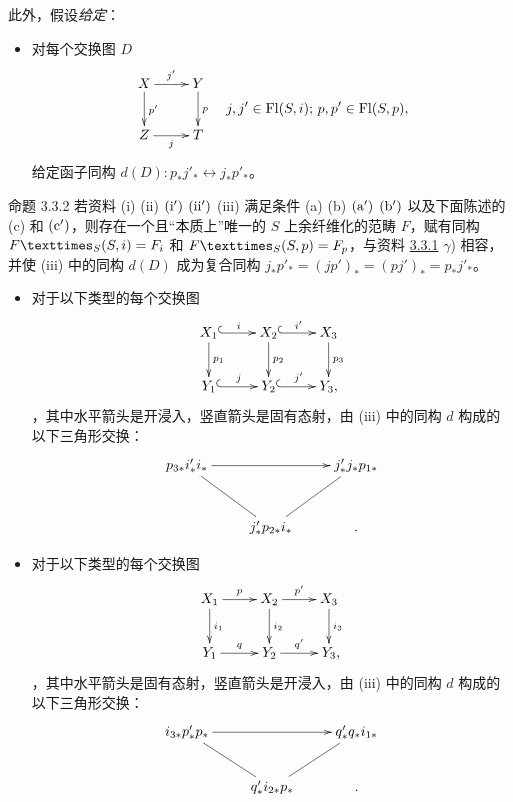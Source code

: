 此外，假设\emph{给定}：
\begin{itemize}
\item[(iii)] 对每个交换图 $D$
\[
\vcenter{
\xymatrix{
X \ar[r]^{j'} \ar[d]^{p'}& Y\ar[d]^{p} \\
Z \ar[r]_{j}             &           T
}}\quad j,j' \in \Fl(S,i)\text{; }
  p,p' \in \Fl(S,p),
\]
给定函子同构 $d(D):p_{\ast}j'_{\ast}\leftrightarrow
j_{\ast}p'_{\ast}$。
\end{itemize}

\begin{enonce*}{命题 3.3.2}
若资料 {\rm (i) (ii) ${\rm (i')}$ ${\rm (ii')}$ (iii)} 满足条件 {\rm (a) (b) ${\rm (a')}$ ${\rm (b')}$} 以及下面陈述的 {\rm(c)} 和 ${\rm (c')}$，则存在一个且“本质上”唯一的 $S$ 上余纤维化的范畴 $F$，赋有同构 $\fprod{F}{(S,i)}{S}=F_i$ 和 $\fprod{F}{(S,p)}{S}=F_p$，与资料 \hyperref[XVII.subsubsec3.3.1]{3.3.1} $\gamma$) 相容，并使 {\rm(iii)} 中的同构 $d(D)$ 成为复合同构 $j_{\ast}p'_{\ast}=(jp')_{\ast}=(pj')_{\ast}=p_{\ast}j'_{\ast}$。
\end{enonce*}

\begin{itemize}
\item[(c)] 对于以下类型的每个交换图
\[
\xymatrix{
X_1 \ar@{^{(}->}[r]^{i} \ar[d]^{p_1}& X_2 \ar@{^{(}->}[r]^{i'}
\ar[d]^{p_2}& X_3 \ar[d]^{p_3}\\
Y_1 \ar@{^{(}->}[r]^{j}& Y_2 \ar@{^{(}->}[r]^{j'}& Y_3,\\
}
\]
，其中\pageoriginale 水平箭头是开浸入，竖直箭头是固有态射，由 (iii) 中的同构 $d$ 构成的以下三角形交换：
\[
\xymatrix@R=1cm{
p_{3{\ast}} i'_{\ast} i_{\ast} \ar[rr] \ar@{-}[rd]&  & j'_{\ast}j_{\ast}p_{1{\ast}}\ar@{-}[ld]\\
                               &j'_{\ast}p_{2{\ast}}
                                i_{\ast}&.
}
\]

\item[(c')] 对于以下类型的每个交换图
\[
\xymatrix{
X_1  \ar[r]^{p} \ar[d]^{i_1}& X_2  \ar[r]^{p'} \ar[d]^{i_2}& X_3 \ar[d]^{i_3}          \\
Y_1         \ar[r]^{q} & Y_2  \ar[r]^{q'} & Y_3\rlap{,}
}
\]
，其中水平箭头是固有态射，竖直箭头是开浸入，由 (iii) 中的同构 $d$ 构成的以下三角形交换：
\[
\xymatrix{
i_{3{\ast}} p'_{\ast} p_{\ast} \ar[rr] \ar@{-}[rd]&    &q'_{\ast} q_{\ast}
i_{1{\ast}} \\
&q'_{\ast} i_{2{\ast}} p_{\ast}  \ar@{-}[ru]&.
}
\]
\end{itemize}

